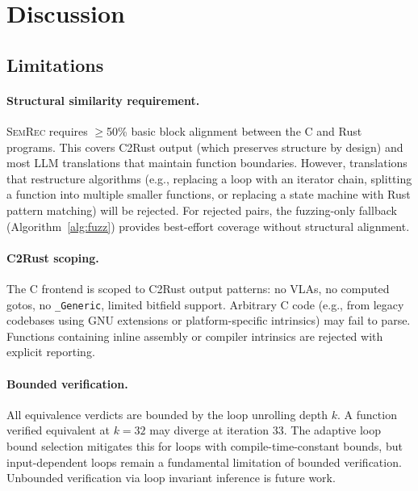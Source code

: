 \documentclass[11pt]{article}
\begin{document}
\section{Discussion}
\label{sec:discussion}

\subsection{Limitations}
\label{sec:limitations}

\paragraph{Structural similarity requirement.}
\textsc{SemRec} requires $\geq$50\% basic block alignment between the C and Rust programs. This covers C2Rust output (which preserves structure by design) and most LLM translations that maintain function boundaries. However, translations that restructure algorithms (e.g., replacing a loop with an iterator chain, splitting a function into multiple smaller functions, or replacing a state machine with Rust pattern matching) will be rejected. For rejected pairs, the fuzzing-only fallback (Algorithm~\ref{alg:fuzz}) provides best-effort coverage without structural alignment.

\paragraph{C2Rust scoping.}
The C frontend is scoped to C2Rust output patterns: no VLAs, no computed gotos, no \texttt{\_Generic}, limited bitfield support. Arbitrary C code (e.g., from legacy codebases using GNU extensions or platform-specific intrinsics) may fail to parse. Functions containing inline assembly or compiler intrinsics are rejected with explicit reporting.

\paragraph{Bounded verification.}
All equivalence verdicts are bounded by the loop unrolling depth $k$. A function verified equivalent at $k = 32$ may diverge at iteration 33. The adaptive loop bound selection mitigates this for loops with compile-time-constant bounds, but input-dependent loops remain a fundamental limitation of bounded verification. Unbounded verification via loop invariant inference is future work.
\end{document}
